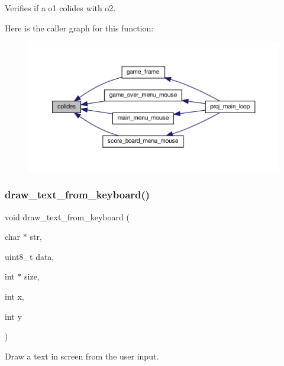 Verifies if a o1 colides with o2. 

Here is the caller graph for this function\+:\nopagebreak
\begin{figure}[H]
\begin{center}
\leavevmode
\includegraphics[width=350pt]{group__utils_gaf433e5aeb6e9df7b15e233a2c4251577_icgraph}
\end{center}
\end{figure}
\mbox{\label{group__utils_gabe39d5da16482ce154af88c3f78a1000}} 
\subsubsection{\texorpdfstring{draw\+\_\+text\+\_\+from\+\_\+keyboard()}{draw\_text\_from\_keyboard()}}
{\footnotesize\ttfamily void draw\+\_\+text\+\_\+from\+\_\+keyboard (\begin{DoxyParamCaption}\item[{char $\ast$}]{str,  }\item[{uint8\+\_\+t}]{data,  }\item[{int $\ast$}]{size,  }\item[{int}]{x,  }\item[{int}]{y }\end{DoxyParamCaption})}



Draw a text in screen from the user input. 

